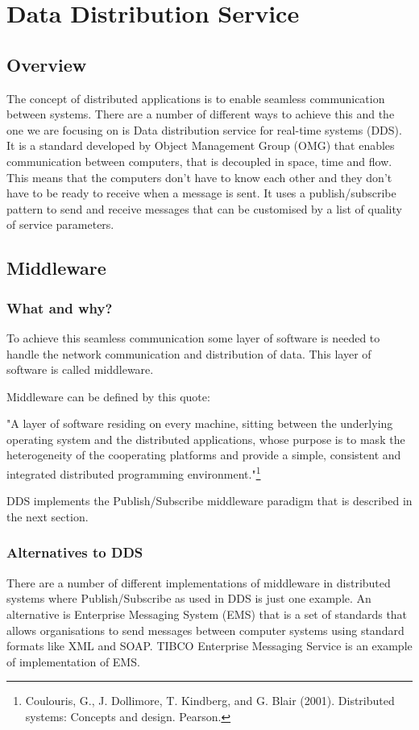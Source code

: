 \chapter{Data Distribution Service}
\section{Overview}
The concept of distributed applications is to enable seamless communication between systems. There are a number of different ways to achieve this and the one we are focusing on is Data distribution service for real-time systems (DDS).
It is a standard developed by Object Management Group (OMG) that enables communication between computers, that is decoupled in space, time and flow. This means that the computers don't have to know each other and they don't have to be ready to receive when a message is sent. It uses a publish/subscribe pattern to send and receive messages that can be customised by a list of quality of service parameters.

\section{Middleware}

\subsection{What and why?}
To achieve this seamless communication some layer of software is needed to handle the network communication and distribution of data. This layer of software is called middleware.

Middleware can be defined by this quote:

"A layer of software residing on every machine, sitting between the
underlying operating system and the distributed applications,
whose purpose is to mask the heterogeneity of the cooperating
platforms and provide a simple, consistent and integrated
distributed programming environment."\footnote{Coulouris, G., J. Dollimore, T. Kindberg, and G. Blair (2001). Distributed systems: Concepts and design. Pearson.}

DDS implements the Publish/Subscribe middleware paradigm that is described in the next section.

\subsection{Alternatives to DDS}

There are a number of different implementations of middleware in distributed systems where Publish/Subscribe as used in DDS is just one example. An alternative is Enterprise Messaging System (EMS) that is a set of standards that allows organisations to send messages between computer systems using standard formats like XML and SOAP.
TIBCO Enterprise Messaging Service is an example of implementation of EMS.

